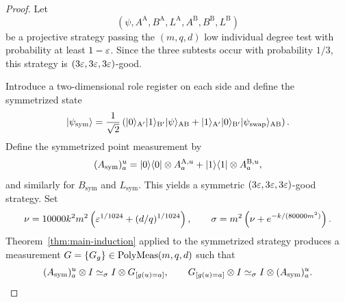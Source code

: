 \begin{proof}
	\leanok
	Let
	\[
		(\psi,A^{\mathrm A},B^{\mathrm A},L^{\mathrm A},A^{\mathrm B},B^{\mathrm B},L^{\mathrm B})
	\]
	be a projective strategy passing the $(m,q,d)$ low individual degree test with probability at least $1-\varepsilon$. Since the three subtests occur with probability $1/3$, this strategy is $(3\varepsilon,3\varepsilon,3\varepsilon)$-good.

	Introduce a two-dimensional role register on each side and define the symmetrized state
	\[
		\lvert \psi_{\mathrm{sym}} \rangle
		=
		\frac{1}{\sqrt{2}}
		\left(
		\lvert 0 \rangle_{\mathrm{A}'}\lvert 1 \rangle_{\mathrm{B}'}\lvert \psi \rangle_{\mathrm{AB}}
		+
		\lvert 1 \rangle_{\mathrm{A}'}\lvert 0 \rangle_{\mathrm{B}'}\lvert \psi_{\mathrm{swap}} \rangle_{\mathrm{AB}}
		\right).
	\]
	Define the symmetrized point measurement by
	\[
		(A_{\mathrm{sym}})_a^u
		=
		\lvert 0 \rangle\langle 0 \rvert \otimes A_a^{\mathrm A,u}
		+
		\lvert 1 \rangle\langle 1 \rvert \otimes A_a^{\mathrm B,u},
	\]
	and similarly for $B_{\mathrm{sym}}$ and $L_{\mathrm{sym}}$. This yields a symmetric $(3\varepsilon,3\varepsilon,3\varepsilon)$-good strategy. Set
	\[
		\nu = 10000k^2m^2\left(\varepsilon^{1/1024}+(d/q)^{1/1024}\right),
		\qquad
		\sigma = m^2\left(\nu+e^{-k/(80000m^2)}\right).
	\]
	Theorem~\ref{thm:main-induction} applied to the symmetrized strategy produces a measurement $G=\{G_g\} \in \mathrm{PolyMeas}(m,q,d)$ such that
	\begin{equation}\label{eq:symmetrized-induction-point-consistency}
		(A_{\mathrm{sym}})_a^u \otimes I \simeq_\sigma I \otimes G_{[g(u)=a]},
		\qquad
		G_{[g(u)=a]} \otimes I \simeq_\sigma I \otimes (A_{\mathrm{sym}})_a^u.
	\end{equation}


\end{proof}
